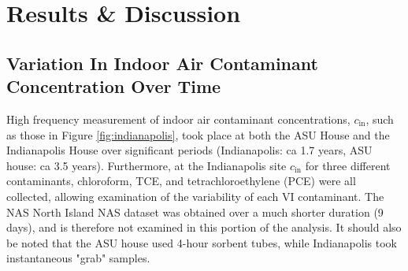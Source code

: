 \documentclass[preprint,12pt]{elsarticle}
\begin{document}
\begin{comment}
  \toprule
  $D_\mathrm{air} \; \mathrm{(m^2/h)}$ & $D_\mathrm{water} \; \mathrm{(m^2/h)}$ & $\rho \; \mathrm{(kg/m^3)}$ & $\mu \; \mathrm{(Pa \cdot s)}$ & $K_H$ & $M \; \mathrm{(g/mol)}$ \\
  $2.47 \cdot 10^{-2}$                 & $3.67 \cdot 10^{-6}$                   & 1.614                                   & $1.86 \cdot 10^{-5}$                          & 0.403 & 131.39                  \\
  \bottomrule
 \end{tabular}
 \bigskip
 \subcaption{Building properties}
 \begin{tabular}{l l l}
  \toprule
  $V_\mathrm{base} \; \mathrm{(m^3)}$ & $L_\mathrm{slab} \; \mathrm{(cm)}$ & $A_e \; \mathrm{(1/hr)}$ \\
  300                                 & 15                                 & 0.5                      \\
  \bottomrule
 \end{tabular}

\end{table}
\end{comment}



\section{Results \& Discussion}\label{s:results}

\subsection{Variation In Indoor Air Contaminant Concentration Over Time}\label{s:results_variation_time}

High frequency measurement of indoor air contaminant concentrations, $c_\mathrm{in}$, such as those in Figure \ref{fig:indianapolis}, took place at both the ASU House and the Indianapolis House over significant periods (Indianapolis: ca 1.7 years, ASU house: ca 3.5 years)\cite{u.s._environmental_protection_agency_assessment_2015,holton_temporal_2013}.
Furthermore, at the Indianapolis site $c_\mathrm{in}$ for three different contaminants, chloroform, TCE, and tetrachloroethylene (PCE) were all collected, allowing examination of the variability of each VI contaminant.
The NAS North Island NAS dataset was obtained over a much shorter duration (9 days), and is therefore not examined in this portion of the analysis.
It should also be noted that the ASU house used 4-hour sorbent tubes, while Indianapolis took instantaneous "grab" samples.\par
\end{document}
